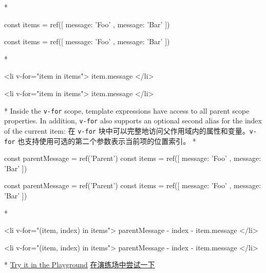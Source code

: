 \begin{paracol}{2}
\switchcolumn[0]*%
\begin{codeJs}
const items = ref([{ message: 'Foo' }, { message: 'Bar' }])
\end{codeJs}
\switchcolumn
\begin{codeJs}
const items = ref([{ message: 'Foo' }, { message: 'Bar' }])
\end{codeJs}
\switchcolumn[0]*%
\begin{codeHtml}
<li v-for="item in items">
  {{ item.message }}
</li>
\end{codeHtml}
\switchcolumn
\begin{codeHtml}
<li v-for="item in items">
  {{ item.message }}
</li>
\end{codeHtml}
\switchcolumn[0]*%
Inside the \texttt{v-for} scope, template expressions have access to all
parent scope properties. In addition, \texttt{v-for} also supports an
optional second alias for the index of the current item:
\switchcolumn
在 \texttt{v-for}
块中可以完整地访问父作用域内的属性和变量。\texttt{v-for}
也支持使用可选的第二个参数表示当前项的位置索引。
\switchcolumn[0]*%
\begin{codeJs}
const parentMessage = ref('Parent')
const items = ref([{ message: 'Foo' }, { message: 'Bar' }])
\end{codeJs}
\switchcolumn
\begin{codeJs}
const parentMessage = ref('Parent')
const items = ref([{ message: 'Foo' }, { message: 'Bar' }])
\end{codeJs}
\switchcolumn[0]*%
\begin{codeHtml}
<li v-for="(item, index) in items">
  {{ parentMessage }} - {{ index }} - {{ item.message }}
</li>
\end{codeHtml}
\switchcolumn
\begin{codeHtml}
<li v-for="(item, index) in items">
  {{ parentMessage }} - {{ index }} - {{ item.message }}
</li>
\end{codeHtml}
\switchcolumn[0]*%
\href{https://play.vuejs.org/\#eNpdTsuqwjAQ/ZVDNlFQu5d64bpwJ7g3LopOJdAmIRlFCPl3p60PcDWcM+eV1X8Iq/uN1FrV6RxtYCTiW/gzzvbBR0ZGpBYFbfQ9tEi1ccadvUuM0ERyvKeUmithMyhn+jCSev4WWaY+vZ7HjH5Sr6F33muUhTR8uW0ThTuJua6mPbJEgGSErmEaENedxX3Z+rgxajbEL2DdhR5zOVOdUSIEDOf8M7IULCHsaPgiMa1eK4QcS6rOSkhdfapVeQLQEWnH}{Try
it in the Playground}
\switchcolumn
\href{https://play.vuejs.org/\#eNpdTsuqwjAQ/ZVDNlFQu5d64bpwJ7g3LopOJdAmIRlFCPl3p60PcDWcM+eV1X8Iq/uN1FrV6RxtYCTiW/gzzvbBR0ZGpBYFbfQ9tEi1ccadvUuM0ERyvKeUmithMyhn+jCSev4WWaY+vZ7HjH5Sr6F33muUhTR8uW0ThTuJua6mPbJEgGSErmEaENedxX3Z+rgxajbEL2DdhR5zOVOdUSIEDOf8M7IULCHsaPgiMa1eK4QcS6rOSkhdfapVeQLQEWnH}{在演练场中尝试一下}

\end{paracol}
